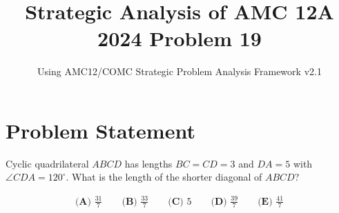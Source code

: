 \documentclass[11pt]{article}
\begin{document}
\title{\textbf{Strategic Analysis of AMC 12A 2024 Problem 19}}
\author{Using AMC12/COMC Strategic Problem Analysis Framework v2.1}
\date{}
\maketitle

\section*{Problem Statement}

Cyclic quadrilateral $ABCD$ has lengths $BC=CD=3$ and $DA=5$ with $\angle CDA=120^\circ$. What is the length of the shorter diagonal of $ABCD$?

\begin{align*}
\textbf{(A) } \frac{31}{7} \qquad 
\textbf{(B) } \frac{33}{7} \qquad 
\textbf{(C) } 5 \qquad 
\textbf{(D) } \frac{39}{7} \qquad 
\textbf{(E) } \frac{41}{7}
\end{align*}

\vspace{0.5cm}
\end{document}
